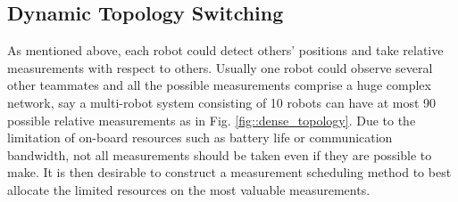 \documentclass[conference]{IEEEtran}
\begin{document}
\subsection{Dynamic Topology Switching}
As mentioned above, each robot could detect others' positions and take relative measurements with respect to others.
Usually one robot could observe several other teammates and all the possible measurements comprise a huge complex network, say a multi-robot system consisting of 10 robots can have at most 90 possible relative measurements as in Fig. \ref{fig::dense_topology}.
Due to the limitation of on-board resources such as battery life or communication bandwidth, not all measurements should be taken even if they are possible to make.
It is then desirable to construct a measurement scheduling method to best allocate the limited resources on the most valuable measurements.
\end{document}
